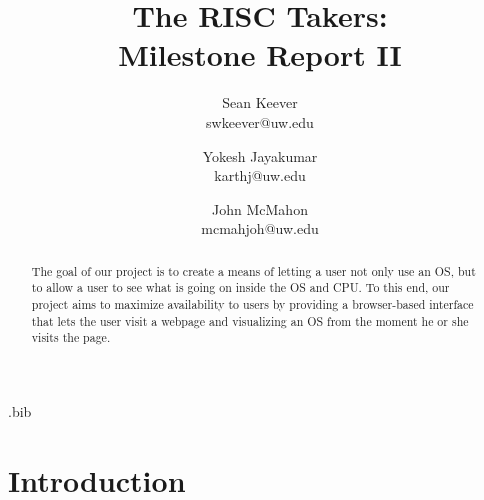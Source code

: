 \usepackage{filecontents}

\usepackage{graphicx}
\usepackage{float}
\graphicspath{ {../images/}}


\begin{filecontents}{\jobname.bib}

\end{filecontents}



\date{}

\title{\Large \bf The RISC Takers:\\
  Milestone Report II}

\author{
  {\rm Sean Keever} \\
  swkeever@uw.edu
  \and
  {\rm Yokesh Jayakumar} \\
  karthj@uw.edu
  \and
  {\rm John McMahon} \\
  mcmahjoh@uw.edu
} %

\maketitle

\begin{abstract}
  The goal of our project is to create a means of letting a user not only use an OS,
  but to allow a user to see what is going on inside the OS and CPU.
  To this end, our project aims to maximize availability to users by
  providing a browser-based interface that lets the user visit a webpage and
  visualizing an OS from the moment he or she visits the page.
\end{abstract}

\section{Introduction}

